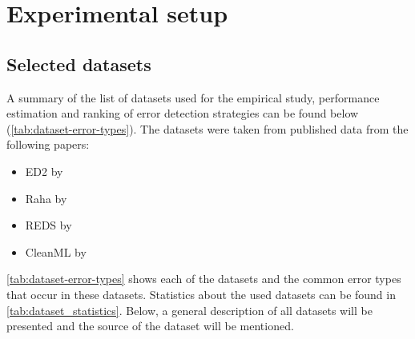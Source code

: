 \chapter{Experimental setup}
\label{chap:experimental_setup}
\section{Selected datasets}
\label{sec:selected_datasets}
A summary of the list of datasets used for the empirical study, performance estimation and ranking of error detection strategies can be found below (\autoref{tab:dataset-error-types}). The datasets were taken from published data from the following papers: 
\begin{itemize}
    \item ED2 by \cite{Neutatz2019-aw}
    \item Raha by \cite{Mahdavi2019-zf}
    \item REDS by \cite{Mahdavi2019-pk}
    \item CleanML by \cite{Li2019-ve}
\end{itemize}

\autoref{tab:dataset-error-types} shows each of the datasets and the common error types that occur in these datasets. Statistics about the used datasets can be found in \autoref{tab:dataset_statistics}. Below, a general description of all datasets will be presented and the source of the dataset will be mentioned.

